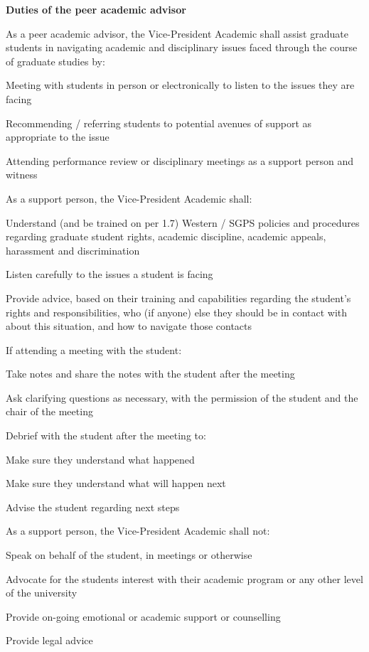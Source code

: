 \begin{longenum}
\textbf{Duties of the peer academic advisor}
\item As a peer academic advisor, the Vice-President Academic shall assist graduate students in navigating academic and disciplinary issues faced through the course of graduate studies by:
\begin{longenum}
\item Meeting with students in person or electronically to listen to the issues they are facing
\item Recommending / referring students to potential avenues of support as appropriate to the issue
\item Attending performance review or disciplinary meetings as a support person and witness
\end{longenum}
\item As a support person, the Vice-President Academic shall:
\begin{longenum}
\item Understand (and be trained on per 1.7) Western / SGPS policies and procedures regarding
graduate student rights, academic discipline, academic appeals, harassment and discrimination
\item Listen carefully to the issues a student is facing
\item Provide advice, based on their training and capabilities regarding the student's rights and responsibilities, who (if anyone) else they should be in contact with about this situation, and how to navigate
those contacts
\item If attending a meeting with the student:
\begin{longenum}
\item Take notes and share the notes with the student after the meeting
\item Ask clarifying questions as necessary, with the permission of the student and the chair of the
meeting
\item Debrief with the student after the meeting to:
\begin{longenum}
\item Make sure they understand what happened
\item Make sure they understand what will happen next
\item Advise the student regarding next steps
\end{longenum}
\end{longenum}
\end{longenum}
\item As a support person, the Vice-President Academic shall not:
\begin{longenum}
\item Speak on behalf of the student, in meetings or otherwise
\item Advocate for the students interest with their academic program or any other level of the
university
\item Provide on-going emotional or academic support or counselling
\item Provide legal advice
\end{longenum}


\end{longenum}
